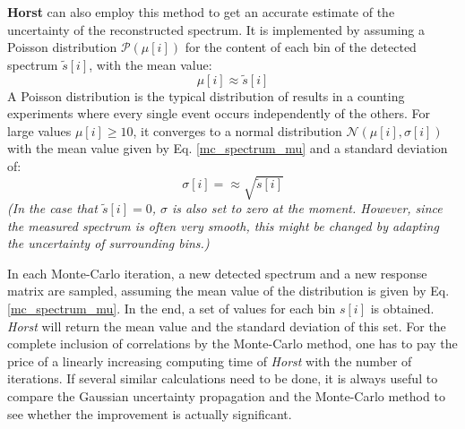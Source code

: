 \documentclass{article}
\begin{document}
\textbf{Horst} can also employ this method to get an accurate estimate of the uncertainty of the reconstructed spectrum.
It is implemented by assuming a Poisson distribution $\mathcal{P}(\mu[i])$ for the content of each bin of the detected spectrum $\tilde{s}[i]$, with the mean value:
%
\begin{equation}
	\label{mc_spectrum_mu}
	\mu [i] \approx \tilde{s}[i]
\end{equation}
%
A Poisson distribution is the typical distribution of results in a counting experiments where every single event occurs independently of the others.
For large values $\mu[i] \geq 10$, it converges to a normal distribution $\mathcal{N}(\mu[i], \sigma[i])$ with the mean value given by Eq. \ref{mc_spectrum_mu} and a standard deviation of:
%
\begin{equation}
	\label{mc_spectrum_sigma}
	\sigma[i] = \approx \sqrt{\tilde{s}[i]}
\end{equation}
%
\textit{(In the case that $\tilde {s} [i] = 0$, $\sigma$ is also set to zero at the moment. However, since the measured spectrum is often very smooth, this might be changed by adapting the uncertainty of surrounding bins.)}

In each Monte-Carlo iteration, a new detected spectrum and a new response matrix are sampled, assuming the mean value of the distribution is given by Eq. \ref{mc_spectrum_mu}.
In the end, a set of values for each bin $s[i]$ is obtained.
\textit{Horst} will return the mean value and the standard deviation of this set.
For the complete inclusion of correlations by the Monte-Carlo method, one has to pay the price of a linearly increasing computing time of \textit{Horst} with the number of iterations.
If several similar calculations need to be done, it is always useful to compare the Gaussian uncertainty propagation and the Monte-Carlo method to see whether the improvement is actually significant.
\end{document}

